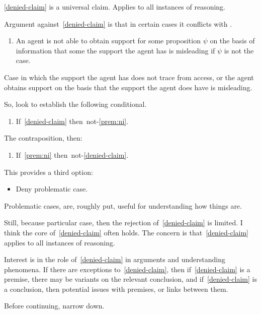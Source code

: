 \documentclass[10pt]{article}
\begin{document}
\ref{denied-claim} is a universal claim.
Applies to all instances of reasoning.

Argument against~\ref{denied-claim} is that in certain cases it conflicts with \nI{-}.

\begin{enumerate}[label=(nI), ref=(nI)]
\item\label{prem:ni} An agent is not able to obtain support for some proposition \(\psi\) on the basis of information that some the support the agent has is misleading if \(\psi\) is not the case.
\end{enumerate}

Case in which the support the agent has does not trace from access, or the agent obtains support on the basis that the support the agent does have is misleading.

So, look to establish the following conditional.

\begin{enumerate}
\item\label{goal:cond} If~\ref{denied-claim} then~not-\ref{prem:ni}.
\end{enumerate}

The contraposition, then:

\begin{enumerate}
\item\label{goal:cond:var} If~\ref{prem:ni} then~not-\ref{denied-claim}.
\end{enumerate}

This provides a third option:
\begin{itemize}
\item Deny problematic case.
\end{itemize}

Problematic cases, are, roughly put, useful for understanding how things are.

Still, because particular case, then the rejection of~\ref{denied-claim} is limited.
I think the core of~\ref{denied-claim} often holds.
The concern is that~\ref{denied-claim} applies to all instances of reasoning.

Interest is in the role of~\ref{denied-claim} in arguments and understanding phenomena.
If there are exceptions to~\ref{denied-claim}, then if~\ref{denied-claim} is a premise, there may be variants on the relevant conclusion, and if~\ref{denied-claim} is a conclusion, then potential issues with premises, or links between them.

Before continuing, narrow down.
\end{document}

